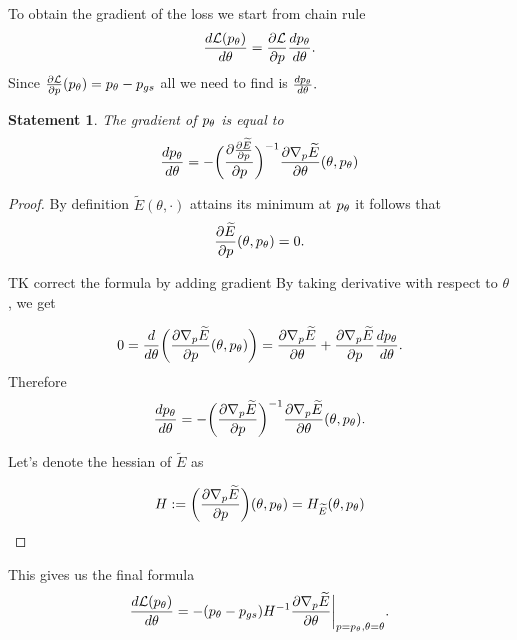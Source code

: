 \documentclass[a4paper,10pt]{report}
\newtheorem{statement}{Statement}
\begin{document}
To obtain the gradient of the loss we start from chain rule
\begin{equation}
 \frac{d\mathcal{L}(p_\theta)}{d \theta} = \frac{\partial \mathcal{L}}{\partial p}\frac{dp_\theta}{d \theta}.
\end{equation}
Since $\frac{\partial \mathcal{L}}{\partial p}(p_\theta )= p_\theta-p_{gs}$ all we need to find is $\frac{dp_\theta}{d \theta}.$



\begin{statement}
The gradient of $p_\theta$ is equal to
 \begin{equation}
   \frac{dp_\theta}{d \theta} = -\bigg(\frac{\partial  \frac{\partial \widetilde{E}}{\partial p}  }{\partial p}\bigg)^{-1} \frac{\partial \nabla_p \widetilde{E}}{\partial \theta}(\theta, p_\theta)
 \end{equation}
\end{statement}

\begin{proof}
By definition $\widetilde{E}(\theta, \cdot)$ attains its minimum at $p_\theta$ it follows that
\begin{equation}
\frac{\partial \widetilde{E}}{\partial p}(\theta, p_\theta) = 0.
\end{equation}

TK correct the formula by adding gradient
By taking derivative with respect to $\theta$, we get


\begin{equation}
0=\frac{d}{d \theta}\bigg(\frac{\partial   \nabla_p \widetilde{E}   }{\partial p}(\theta, p_\theta)\bigg) = \frac{\partial  \nabla_p \widetilde{E}  }{\partial \theta} + \frac{\partial  \nabla_p \widetilde{E}  }{\partial p} \frac{dp_\theta}{d \theta}.
\end{equation}
Therefore
\begin{equation}
 \frac{dp_\theta}{d \theta} = -\bigg(\frac{\partial \nabla_p \widetilde{E}}{\partial p}\bigg)^{-1} \frac{\partial \nabla_p \widetilde{E}}{\partial \theta}(\theta, p_\theta).
\end{equation}

Let's denote the hessian of $\widetilde{E}$ as

\begin{equation}
 H := \bigg(\frac{\partial \nabla_p \widetilde{E}}{\partial p}\bigg)(\theta,p_\theta) = H_{\widetilde{E}}(\theta,p_\theta)
\end{equation}
\end{proof}
This gives us the final formula
\begin{equation}
 \frac{d\mathcal{L}(p_\theta)}{d \theta} = - (p_\theta - p_{gs}) H^{-1}  \frac{\partial \nabla_p \widetilde{E}}{\partial \theta}\bigg|_{p=p_\theta, \theta=\theta}.
\end{equation}
\end{document}
